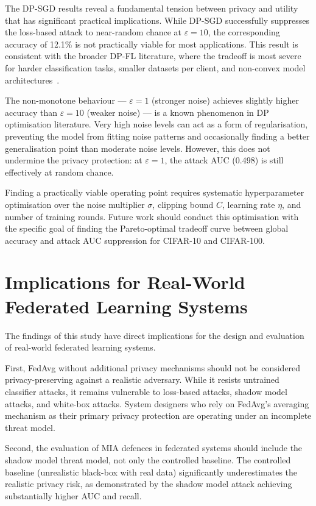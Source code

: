 \documentclass[12pt, a4paper]{report}
\begin{document}
The DP-SGD results reveal a fundamental tension between privacy and utility that
has significant practical implications. While DP-SGD successfully suppresses the
loss-based attack to near-random chance at $\varepsilon = 10$, the corresponding
accuracy of 12.1\% is not practically viable for most applications. This result
is consistent with the broader DP-FL literature, where the tradeoff is most severe
for harder classification tasks, smaller datasets per client, and non-convex
model architectures~\cite{yin2024dpfl, hu2024dp}.

The non-monotone behaviour --- $\varepsilon = 1$ (stronger noise) achieves slightly
higher accuracy than $\varepsilon = 10$ (weaker noise) --- is a known phenomenon
in DP optimisation literature. Very high noise levels can act as a form of
regularisation, preventing the model from fitting noise patterns and occasionally
finding a better generalisation point than moderate noise levels. However, this
does not undermine the privacy protection: at $\varepsilon = 1$, the attack AUC
(0.498) is still effectively at random chance.

Finding a practically viable operating point requires systematic hyperparameter
optimisation over the noise multiplier $\sigma$, clipping bound $C$, learning
rate $\eta$, and number of training rounds. Future work should conduct this
optimisation with the specific goal of finding the Pareto-optimal tradeoff curve
between global accuracy and attack AUC suppression for CIFAR-10 and CIFAR-100.

\section{Implications for Real-World Federated Learning Systems}

The findings of this study have direct implications for the design and evaluation
of real-world federated learning systems.

First, FedAvg without additional privacy mechanisms should not be considered
privacy-preserving against a realistic adversary. While it resists untrained
classifier attacks, it remains vulnerable to loss-based attacks, shadow model
attacks, and white-box attacks. System designers who rely on FedAvg's averaging
mechanism as their primary privacy protection are operating under an incomplete
threat model.

Second, the evaluation of MIA defences in federated systems should include the
shadow model threat model, not only the controlled baseline. The controlled
baseline (unrealistic black-box with real data) significantly underestimates the
realistic privacy risk, as demonstrated by the shadow model attack achieving
substantially higher AUC and recall.
\end{document}
